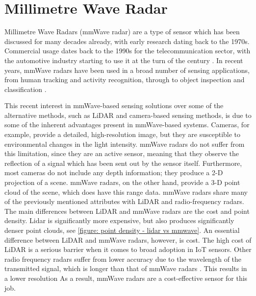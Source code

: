 \section{Millimetre Wave Radar}
\label{section: background - millimetre wave radar}

Millimetre Wave Radars (mmWave radar) are a type of sensor which has been discussed for many decades already, with early research dating back to the 1970s.
Commercial usage dates back to the 1990s for the telecommunication sector, with the automotive industry starting to use it at the turn of the century \cite{menzel2008years}.
In recent years, mmWave radars have been used in a broad number of sensing applications, from human tracking and activity recognition, through to object inspection and classification \cite[Fig.~2]{vanberlo2021millimeter}.

This recent interest in mmWave-based sensing solutions over some of the alternative methods, such as LiDAR and camera-based sensing methods, is due to some of the inherent advantages present in mmWave-based systems.
Cameras, for example, provide a detailed, high-resolution image, but they are susceptible to environmental changes in the light intensity.
mmWave radars do not suffer from this limitation, since they are an active sensor, meaning that they observe the reflection of a signal which has been sent out by the sensor itself.
Furthermore, most cameras do not include any depth information; they produce a 2-D projection of a scene.
mmWave radars, on the other hand, provide a 3-D point cloud of the scene, which does have this range data.
mmWave radars share many of the previously mentioned attributes with LiDAR and radio-frequency radars.
The main differences between LiDAR and mmWave radars are the cost and point density.
Lidar is significantly more expensive, but also produces significantly denser point clouds, see \cref{figure: point density - lidar vs mmwave}.
An essential difference between LiDAR and mmWave radars, however, is cost.
The high cost of LiDAR is a serious barrier when it comes to broad adoption in IoT sensors.
Other radio frequency radars suffer from lower accuracy due to the wavelength of the transmitted signal, which is longer than that of mmWave radars \cite{yan2025advancements}.
This results in a lower resolution 
As a result, mmWave radars are a cost-effective sensor for this job.

